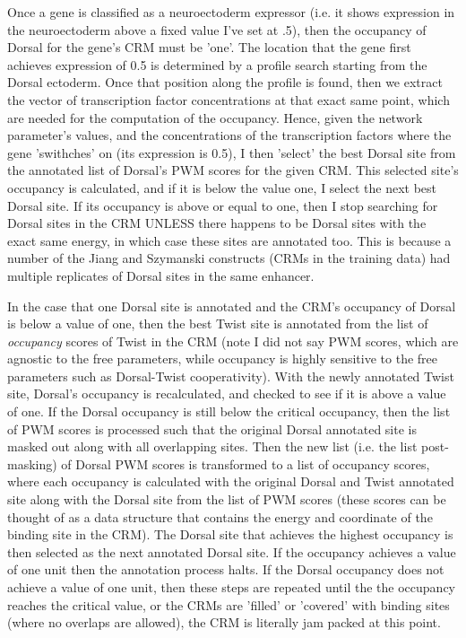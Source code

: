   Once a gene is classified as a neuroectoderm expressor (i.e. it shows expression in the neuroectoderm above a fixed value I've set at .5), then the occupancy of Dorsal for the gene's CRM must be 'one'.  The location that the gene first achieves expression of 0.5 is determined by a profile search starting from the Dorsal ectoderm.  Once that position along the profile is found, then we extract the vector of transcription factor concentrations at that exact same point, which are needed for the computation of the occupancy.  Hence, given the network parameter's values, and the concentrations of the transcription factors where the gene 'swithches' on (its expression is 0.5), I then 'select' the best Dorsal site from the annotated list of Dorsal's PWM scores for the given CRM.  This selected site's occupancy is calculated, and if it is below the value one, I select the next best Dorsal site.  If its occupancy is above or equal to one, then I stop searching for Dorsal sites in the CRM UNLESS there happens to be Dorsal sites with the exact same energy, in which case these sites are annotated too.  This is because a number of the Jiang and Szymanski constructs (CRMs in the training data) had multiple replicates of Dorsal sites in the same enhancer. 
  
  In the case that one Dorsal site is annotated and the CRM's occupancy of Dorsal is below a value of one, then the best Twist site is annotated from the list of \textit{occupancy} scores of Twist in the CRM (note I did not say PWM scores, which are agnostic to the free parameters, while occupancy is highly sensitive to the free parameters such as Dorsal-Twist cooperativity).  With the newly annotated Twist site, Dorsal's occupancy is recalculated, and checked to see if it is above a value of one.  If the Dorsal occupancy is still below the critical occupancy, then the list of PWM scores is processed such that the original Dorsal annotated site is masked out along with all overlapping sites.  Then the new list (i.e. the list post-masking) of Dorsal PWM scores is transformed to a list of occupancy scores, where each occupancy is calculated with the original Dorsal and Twist annotated site along with the Dorsal site from the list of PWM scores (these scores can be thought of as a data structure that contains the energy and coordinate of the binding site in the CRM).  The Dorsal site that achieves the highest occupancy is then selected as the next annotated Dorsal site.  If the occupancy achieves a value of one unit then the annotation process halts.  If the Dorsal occupancy does not achieve a value of one unit, then these steps are repeated until the the occupancy reaches the critical value, or the CRMs are 'filled' or 'covered' with binding sites (where no overlaps are allowed), the CRM is literally jam packed at this point.  
  
